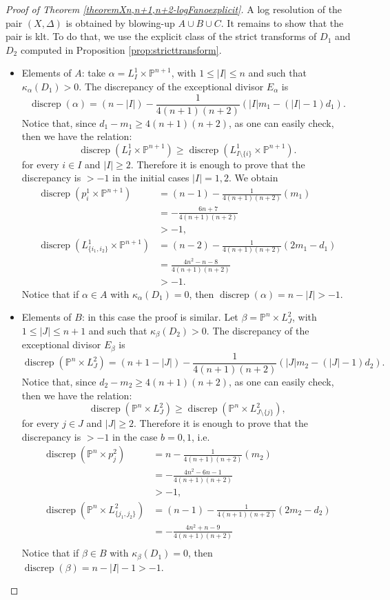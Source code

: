 \documentclass[a4paper,11pt]{article}
\newcommand{\PP}{\mathbb P}
\newcommand{\discrep}{\operatorname{discrep}}
\begin{document}
\begin{proof}[Proof of Theorem \ref{theoremXn,n+1,n+2-logFanoexplicit}]
A log resolution of the pair $(X,\Delta)$ is obtained by blowing-up $A\cup B\cup C$. 
It remains to show that the pair is klt.
To do that, we use the explicit class of the strict transforms of $D_1$ and $D_2$ computed in Proposition \ref{prop:stricttransform}.
  \begin{itemize}
\item  Elements of $A$: take $\alpha=L^1_I\times \PP^{n+1}$, with $1\le|I|\le n$ and such that $\kappa_\alpha(D_1)>0$. The discrepancy of the exceptional divisor $E_\alpha$ is
$$
\discrep(\alpha)=
(n-|I|)-\frac{1}{4(n+1)(n+2)}(|I|m_1-(|I|-1)d_1).
$$
Notice that, since $d_1-m_1\ge 4(n+1)(n+2)$, as one can easily check, then we have the relation:
$$
\discrep(L^1_{I}\times \PP^{n+1})\ge \discrep(L^1_{I\setminus\{i\}}\times \PP^{n+1}).
$$
for every $i\in I$ and $|I|\ge 2$.
Therefore it is enough to prove that the discrepancy is $>-1$ in the initial cases $|I|=1,2$. We obtain
\begin{align*}
\discrep({p^1_i}\times \PP^{n+1})
&=(n-1)-\frac{1}{4(n+1)(n+2)}(m_1)\\ 
&=-\frac{6n+7}{4(n+1)(n+2)}\\ &>-1,\\
\discrep(
L^1_{\{i_1,i_2\}}\times \PP^{n+1})&=(n-2)-\frac{1}{4(n+1)(n+2)}(2m_1-d_1)\\ 
&=\frac{4n^2-n-8}{4(n+1)(n+2)}\\ &>-1. 
\end{align*}
Notice that if $\alpha\in A$ with $\kappa_\alpha(D_1)=0$, then $\discrep(\alpha)=n-|I|>-1.$
\item Elements of $B$: in this case the proof is similar. Let $\beta =\PP^n\times L^2_J$, with $1\le|J|\le n+1$ and such that $\kappa_\beta(D_2)>0$. The discrepancy of the exceptional divisor $E_\beta$ is 
$$
\discrep(\PP^{n}\times L^2_J)=(n+1-|J|)-\frac{1}{4(n+1)(n+2)}(|J|m_2-(|J|-1)d_2).
$$
Notice that, since $d_2-m_2\ge 4(n+1)(n+2)$, as one can easily check, then we have the relation:
$$
\discrep(\PP^{n}\times L^2_{J})\ge \discrep(\PP^{n}\times L^2_{J\setminus\{j\}}),
$$
for every $j\in  J$ and $|J|\ge2$.
Therefore it is enough to prove that the discrepancy is $>-1$ in the case $b=0,1$, i.e.
\begin{align*}
\discrep( \PP^{n}\times p^2_j)&=n-\frac{1}{4(n+1)(n+2)}(m_2)\\
&=-\frac{4n^2-6n-1}{4(n+1)(n+2)}\\
&>-1,\\
\discrep( \PP^{n}\times L^2_{\{j_1,j_2\}})
&=
(n-1)-\frac{1}{4(n+1)(n+2)}(2m_2-d_2)\\
&=-\frac{4n^2+n-9}{4(n+1)(n+2)}\\
\end{align*}
Notice that if $\beta\in B$ with $\kappa_\beta(D_1)=0$, then $\discrep(\beta)=n-|I|-1>-1.$


\end{itemize}
\end{proof}
\end{document}
